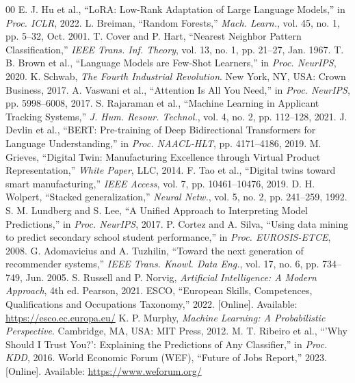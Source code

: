 \documentclass[conference]{IEEEtran}
\begin{document}
\begin{thebibliography}{00}
 E. J. Hu et al., ``LoRA: Low-Rank Adaptation of Large Language Models,'' in \textit{Proc. ICLR}, 2022.
 L. Breiman, ``Random Forests,'' \textit{Mach. Learn.}, vol. 45, no. 1, pp. 5--32, Oct. 2001.
 T. Cover and P. Hart, ``Nearest Neighbor Pattern Classification,'' \textit{IEEE Trans. Inf. Theory}, vol. 13, no. 1, pp. 21--27, Jan. 1967.
 T. B. Brown et al., ``Language Models are Few-Shot Learners,'' in \textit{Proc. NeurIPS}, 2020.
 K. Schwab, \textit{The Fourth Industrial Revolution}. New York, NY, USA: Crown Business, 2017.
 A. Vaswani et al., ``Attention Is All You Need,'' in \textit{Proc. NeurIPS}, pp. 5998--6008, 2017.
 S. Rajaraman et al., ``Machine Learning in Applicant Tracking Systems,'' \textit{J. Hum. Resour. Technol.}, vol. 4, no. 2, pp. 112--128, 2021.
 J. Devlin et al., ``BERT: Pre-training of Deep Bidirectional Transformers for Language Understanding,'' in \textit{Proc. NAACL-HLT}, pp. 4171--4186, 2019.
 M. Grieves, ``Digital Twin: Manufacturing Excellence through Virtual Product Representation,'' \textit{White Paper}, LLC, 2014.
 F. Tao et al., ``Digital twins toward smart manufacturing,'' \textit{IEEE Access}, vol. 7, pp. 10461--10476, 2019.
 D. H. Wolpert, ``Stacked generalization,'' \textit{Neural Netw.}, vol. 5, no. 2, pp. 241--259, 1992.
 S. M. Lundberg and S. Lee, ``A Unified Approach to Interpreting Model Predictions,'' in \textit{Proc. NeurIPS}, 2017.
 P. Cortez and A. Silva, ``Using data mining to predict secondary school student performance,'' in \textit{Proc. EUROSIS-ETCE}, 2008.
 G. Adomavicius and A. Tuzhilin, ``Toward the next generation of recommender systems,'' \textit{IEEE Trans. Knowl. Data Eng.}, vol. 17, no. 6, pp. 734--749, Jun. 2005.
 S. Russell and P. Norvig, \textit{Artificial Intelligence: A Modern Approach}, 4th ed. Pearson, 2021.
 ESCO, ``European Skills, Competences, Qualifications and Occupations Taxonomy,'' 2022. [Online]. Available: \url{https://esco.ec.europa.eu/}
 K. P. Murphy, \textit{Machine Learning: A Probabilistic Perspective}. Cambridge, MA, USA: MIT Press, 2012.
 M. T. Ribeiro et al., ``'Why Should I Trust You?': Explaining the Predictions of Any Classifier,'' in \textit{Proc. KDD}, 2016.
 World Economic Forum (WEF), ``Future of Jobs Report,'' 2023. [Online]. Available: \url{https://www.weforum.org/}

\end{thebibliography}
\end{document}
